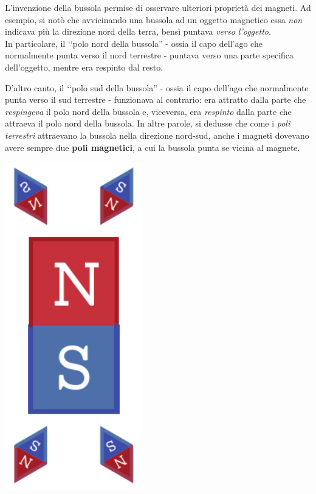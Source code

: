 L'invenzione della bussola permise di osservare ulteriori proprietà dei magneti. Ad esempio, si notò che avvicinando una bussola ad un oggetto magnetico essa \textit{non} indicava più la direzione nord della terra, bensì puntava \textit{verso l'oggetto}.\\
In particolare, il ‘‘polo nord della bussola'' - ossia il capo dell'ago che normalmente punta verso il nord terrestre - puntava verso una parte specifica dell'oggetto, mentre era respinto dal resto.\\
\begin{minipage}{0.79\textwidth}
D'altro canto, il ‘‘polo sud della bussola'' - ossia il capo dell'ago che normalmente punta verso il sud terrestre  - funzionava al contrario: era attratto dalla parte che \textit{respingeva} il polo nord della bussola e, viceversa, era \textit{respinto} dalla parte che attraeva il polo nord della bussola.
In altre parole, si dedusse che come i \textit{poli terrestri} attraevano la bussola nella direzione nord-sud, anche i magneti dovevano avere sempre due \textbf{poli magnetici}, a cui la bussola punta se vicina al magnete.
\end{minipage}\hspace{5pt}
\begin{minipage}{0.2\textwidth}
\begin{center}
	\includegraphics[width=0.45\textwidth]{images/chp7/chp7magnetebussola.pdf}
\end{center}
\end{minipage}

